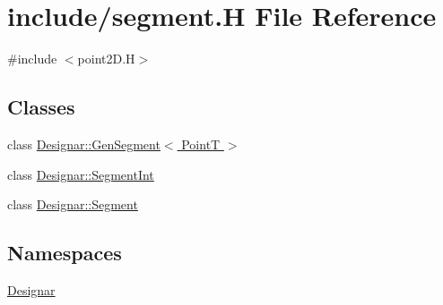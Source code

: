 \hypertarget{segment_8_h}{}\section{include/segment.H File Reference}
\label{segment_8_h}
{\ttfamily \#include $<$point2\+D.\+H$>$}\newline
\subsection*{Classes}
\begin{DoxyCompactItemize}
\item 
class \hyperlink{class_designar_1_1_gen_segment}{Designar\+::\+Gen\+Segment$<$ Point\+T $>$}
\item 
class \hyperlink{class_designar_1_1_segment_int}{Designar\+::\+Segment\+Int}
\item 
class \hyperlink{class_designar_1_1_segment}{Designar\+::\+Segment}
\end{DoxyCompactItemize}
\subsection*{Namespaces}
\begin{DoxyCompactItemize}
\item 
 \hyperlink{namespace_designar}{Designar}
\end{DoxyCompactItemize}
